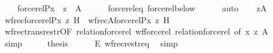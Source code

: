 \begin{isabellebody}
\ \ \ \ {\isachardoublequoteopen}forcerel{\isacharparenleft}{\kern0pt}P{\isacharcomma}{\kern0pt}x{\isacharparenright}{\kern0pt}\ {\isacharminus}{\kern0pt}{\isacharbackquote}{\kern0pt}{\isacharbackquote}{\kern0pt}\ {\isacharbraceleft}{\kern0pt}z{\isacharbraceright}{\kern0pt}\ {\isasymsubseteq}\ {\isacharquery}{\kern0pt}A{\isachardoublequoteclose}\isanewline
\ \ \ \ \isamarkupfalse%
\ forcerel{\isacharunderscore}{\kern0pt}eq\ forcerel{\isacharunderscore}{\kern0pt}below\isanewline
\ \ \ \ \isamarkupfalse%
\ auto\isanewline
\ \ \isamarkupfalse%
\ {\isacartoucheopen}z{\isasymin}{\isacharquery}{\kern0pt}A{\isacartoucheclose}\isanewline
\ \ \isamarkupfalse%
\ {\isachardoublequoteopen}wfrec{\isacharparenleft}{\kern0pt}forcerel{\isacharparenleft}{\kern0pt}P{\isacharcomma}{\kern0pt}x{\isacharparenright}{\kern0pt}{\isacharcomma}{\kern0pt}\ z{\isacharcomma}{\kern0pt}\ H{\isacharparenright}{\kern0pt}\ {\isacharequal}{\kern0pt}\ wfrec{\isacharbrackleft}{\kern0pt}{\isacharquery}{\kern0pt}A{\isacharbrackright}{\kern0pt}{\isacharparenleft}{\kern0pt}forcerel{\isacharparenleft}{\kern0pt}P{\isacharcomma}{\kern0pt}x{\isacharparenright}{\kern0pt}{\isacharcomma}{\kern0pt}\ z{\isacharcomma}{\kern0pt}\ H{\isacharparenright}{\kern0pt}{\isachardoublequoteclose}\isanewline
\ \ \ \ \isamarkupfalse%
\ wfrec{\isacharunderscore}{\kern0pt}trans{\isacharunderscore}{\kern0pt}restr{\isacharbrackleft}{\kern0pt}OF\ relation{\isacharunderscore}{\kern0pt}forcerel{\isacharparenleft}{\kern0pt}{}{\isacharparenright}{\kern0pt}\ wf{\isacharunderscore}{\kern0pt}forcerel\ relation{\isacharunderscore}{\kern0pt}forcerel{\isacharparenleft}{\kern0pt}{}{\isacharparenright}{\kern0pt}{\isacharcomma}{\kern0pt}\ of\ x\ z\ {\isacharquery}{\kern0pt}A{\isacharbrackright}{\kern0pt}\isanewline
\ \ \ \ \isamarkupfalse%
\ simp\isanewline
\ \ \isamarkupfalse%
\ \isamarkupfalse%
\ {\isacharquery}{\kern0pt}thesis\isanewline
\ \ \ \ \isamarkupfalse%
\ E\ wfrec{\isacharunderscore}{\kern0pt}restr{\isacharunderscore}{\kern0pt}eq\ \isamarkupfalse%
\ simp\isanewline
{}\isamarkupfalse%
%
\endisatagproof
{\isafoldproof}%
%
\isadelimproof
%
\endisadelimproof
%
\isadelimdocument
%
\endisadelimdocument
%
\isatagdocument
%
\isamarkuptrue%
%
\endisatagdocument
{\isafolddocument}%
%
\isadelimdocument
%
\endisadelimdocument
{}\isamarkupfalse%

\end{isabellebody}
